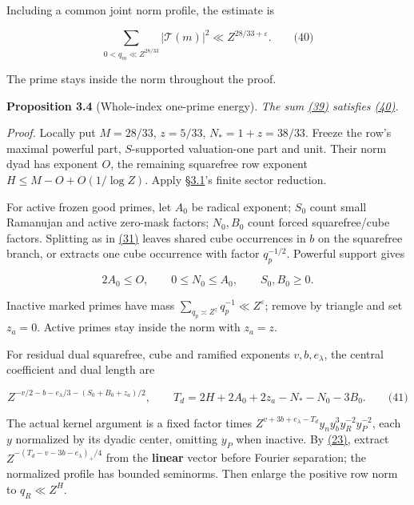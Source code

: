 Including a common joint norm profile, the estimate is

\hypertarget{cf:eq:4.6}{}

\label{cf:eq:4.6}

\[
\sum_{0<q_m\ll Z^{28/33}}|\mathcal T(m)|^2\ll Z^{28/33+\varepsilon}.
\qquad\text{(40)}
\]

The prime stays inside the norm throughout the proof.

\textbf{Proposition 3.4} (Whole-index one-prime energy). \emph{\hypertarget{cf:one-prime-energy}{}\label{cf:one-prime-energy} The sum \protect\hyperlink{cf:eq:4.5}{(39)} satisfies \protect\hyperlink{cf:eq:4.6}{(40)}.}

\emph{Proof.} Locally put \(M=28/33\), \(z=5/33\), \(N_*=1+z=38/33\). Freeze the row's maximal powerful part, \(S\)-supported valuation-one part and unit. Their norm dyad has exponent \(O\), the remaining squarefree row exponent \(H\le M-O+O(1/\log Z)\). Apply §\protect\hyperlink{cf:sec:B.1}{3.1}'s finite sector reduction.

For active frozen good primes, let \(A_0\) be radical exponent; \(S_0\) count small Ramanujan and active zero-mask factors; \(N_0,B_0\) count forced squarefree/cube factors. Splitting as in \protect\hyperlink{cf:eq:B.15}{(31)} leaves shared cube occurrences in \(b\) on the squarefree branch, or extracts one cube occurrence with factor \(q_p^{-1/2}\). Powerful support gives

\[
2A_0\le O,\qquad 0\le N_0\le A_0,\qquad S_0,B_0\ge0.
\]

Inactive marked primes have mass \(\sum_{q_p\asymp Z^z}q_p^{-1}\ll Z^\varepsilon\); remove by triangle and set \(z_a=0\). Active primes stay inside the norm with \(z_a=z\).

For residual dual squarefree, cube and ramified exponents \(v,b,e_\lambda\), the central coefficient and dual length are

\hypertarget{cf:eq:B.22}{}

\label{cf:eq:B.22}

\[
Z^{-v/2-b-e_\lambda/3-(S_0+B_0+z_a)/2},\qquad
 T_d=2H+2A_0+2z_a-N_*-N_0-3B_0.
\qquad\text{(41)}
\]

The actual kernel argument is a fixed factor times \(Z^{v+3b+e_\lambda-T_d}y_ny_b^3y_R^{-2}y_P^{-2}\), each \(y\) normalized by its dyadic center, omitting \(y_P\) when inactive. By \protect\hyperlink{cf:eq:B.7}{(23)}, extract \(Z^{-(T_d-v-3b-e_\lambda)_+/4}\) from the \textbf{linear} vector before Fourier separation; the normalized profile has bounded seminorms. Then enlarge the positive row norm to \(q_R\ll Z^H\).

